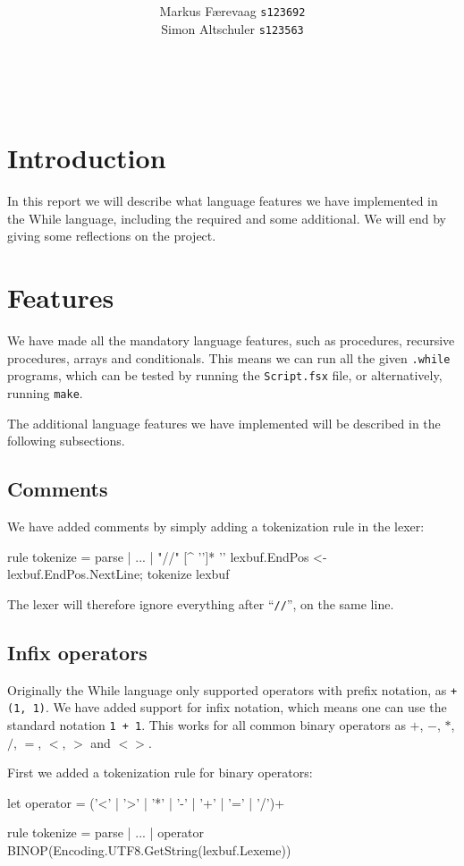 \documentclass{article}
\title{\TITLE\\ {\large \COURSE}}
\date{\DATE}
\author{
  Markus Færevaag {\tt s123692}\\
  Simon Altschuler {\tt s123563}
}
\begin{document}
\maketitle
\vspace{10cm}
 \\
\clearpage


\section{Introduction}
In this report we will describe what language features we have
implemented in the While language, including the required and some
additional. We will end by giving some reflections on the
project.


\section{Features}
We have made all the mandatory language features, such as procedures,
recursive procedures, arrays and conditionals. This means we can run
all the given {\tt .while} programs, which can be tested by running
the {\tt Script.fsx} file, or alternatively, running {\tt make}.

The additional language features we have implemented will be described
in the following subsections.

\subsection{Comments}
We have added comments by simply adding a tokenization rule in the
lexer:
\begin{fs}
rule tokenize =
  parse
  | ...
  | "//" [^ '\n']* '\n' { lexbuf.EndPos <- lexbuf.EndPos.NextLine; tokenize lexbuf }
\end{fs}
The lexer will therefore ignore everything after ``{\tt //}'', on the same line.

\subsection{Infix operators}
Originally the While language only supported operators with prefix
notation, as {\tt +(1, 1)}. We have added support for infix notation,
which means one can use the standard notation {\tt 1 + 1}. This works
for all common binary operators as $+$, $-$, $*$, $/$, $=$, $<$,
$>$ and $< >$.

First we added a tokenization rule for binary operators:
\begin{fs}
let operator  = ('<' | '>' | '*' | '-' | '+' | '=' | '/')+

rule tokenize =
  parse
  | ...
  | operator    { BINOP(Encoding.UTF8.GetString(lexbuf.Lexeme)) }
\end{fs}
\end{document}
